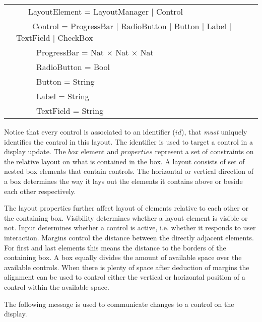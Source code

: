 \documentclass{article}
\begin{document}
\begin{table}[H]
\begin{center}
\begin{tabular}{|ll|}
                       & \ \ \ LayoutElement = LayoutManager $|$ Control \\
                       & \ \ \ \ Control = ProgressBar $|$ RadioButton $|$ Button $|$ Label $|$ TextField $|$ CheckBox \\
                       & \ \ \ \ \ ProgressBar = Nat $\times$ Nat $\times$ Nat \\
                       & \ \ \ \ \ RadioButton = Bool \\
                       & \ \ \ \ \ Button      = String \\
                       & \ \ \ \ \ Label       = String \\
                       & \ \ \ \ \ TextField   = String \\
      \hline
     \end{tabular}
    \end{center}
   \end{table}
   \vspace{-0.4cm}
   \noindent Notice that every control is associated to an identifier ($id$),
   that \emph{must} uniquely identifies the control in this layout. The
   identifier is used to target a control in a display update.  The $box$
   element and $properties$ represent a set of constraints on the relative
   layout on what is contained in the box. A layout consists of set of nested
   box elements that contain controls.  The horizontal or vertical direction of
   a box determines the way it lays out the elements it contains above or
   beside each other respectively.

   The layout properties further affect layout of elements relative to each
   other or the containing box. Visibility determines whether a layout element
   is visible or not. Input determines whether a control is active, i.e.
   whether it responds to user interaction. Margins control the distance
   between the directly adjacent elements. For first and last elements this
   means the distance to the borders of the containing box. A box equally
   divides the amount of available space over the available controls. When
   there is plenty of space after deduction of margins the alignment can be
   used to control either the vertical or horizontal position of a control
   within the available space.

   The following message is used to communicate changes to a control on the
   display.
\end{document}
